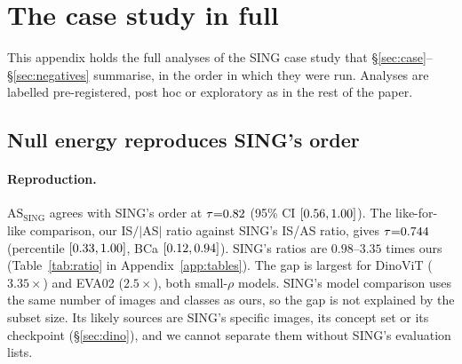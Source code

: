 \documentclass[10pt]{article}
\newcommand{\ASS}{\mathrm{AS}_{\mathrm{SING}}}
\begin{document}
\begin{table}[H]
\centering\footnotesize

\caption{Round-6 pre-registered verdicts (\texttt{PREREG\_R6.md}, pushed with its code and synthetic unit tests before any real-model number; the content labels are registered outcomes, not readings, see Appendix~\ref{app:r6}). $\tau_{\mathrm{EQ}}$ on E12 / S11; content counts are $|C_1|\ge2$ / $|\Delta_{\mathrm{arb}}|\ge2$ out of 13 models.}
\label{tab:prereg6}
\end{table}

\begin{table}[H]
\centering\footnotesize

\caption{Rounds 7 and 8, pre-registered tests and outcomes. Round 7 was run on four models (ResNet50, EfficientNet-B0, ResNeXt101, DINOv2-L); its corrected CIs are post hoc. Round 8 gates are per base (ResNet50, DINOv2-L, ResNeXt101) or over all 13 models. No kill fired in either round.}
\label{tab:prereg78}
\end{table}

\section{The case study in full}
\label{app:case}
This appendix holds the full analyses of the SING case study that \S\ref{sec:case}--\S\ref{sec:negatives} summarise, in the order in which they were run. Analyses are labelled pre-registered, post hoc or exploratory as in the rest of the paper.

\subsection{Null energy reproduces SING's order}
\label{sec:energy}
\paragraph{Reproduction.}
$\ASS$ agrees with SING's order at $\tau{=}0.82$ (95\% CI $[0.56,1.00]$).
The like-for-like comparison, our IS$/|$AS$|$ ratio against SING's IS/AS ratio, gives $\tau{=}0.744$ (percentile $[0.33,1.00]$, BCa $[0.12,0.94]$).
SING's ratios are $0.98$--$3.35$ times ours (Table~\ref{tab:ratio} in Appendix~\ref{app:tables}).
The gap is largest for DinoViT ($3.35\times$) and EVA02 ($2.5\times$), both small-$\rho$ models.
SING's model comparison uses the same number of images and classes as ours, so the gap is not explained by the subset size.
Its likely sources are SING's specific images, its concept set or its checkpoint (\S\ref{sec:dino}), and we cannot separate them without SING's evaluation lists.
\end{document}
